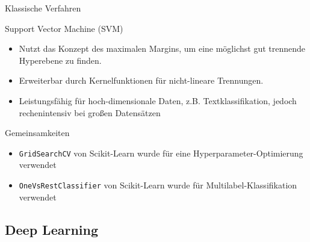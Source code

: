 \documentclass[aspectratio=169]{beamer} %
\begin{document}
\begin{frame}{Klassische Verfahren}
    \begin{block}{Support Vector Machine (SVM)}
        \begin{itemize}
            \item Nutzt das Konzept des maximalen Margins, um eine möglichst gut trennende Hyperebene zu finden.
            \item Erweiterbar durch Kernelfunktionen für nicht-lineare Trennungen.
            \item Leistungsfähig für hoch-dimensionale Daten, z.B. Textklassifikation, jedoch rechenintensiv bei großen Datensätzen
        \end{itemize}
    \end{block}
\end{frame}


\begin{frame}
    \begin{block}{Gemeinsamkeiten}
        \begin{itemize}
            \item \texttt{GridSearchCV} von Scikit-Learn wurde für eine Hyperparameter-Optimierung verwendet
            \item \texttt{OneVsRestClassifier} von Scikit-Learn wurde für Multilabel-Klassifikation verwendet
        \end{itemize}
    \end{block}
\end{frame}

\subsection{Deep Learning}
\end{document}
